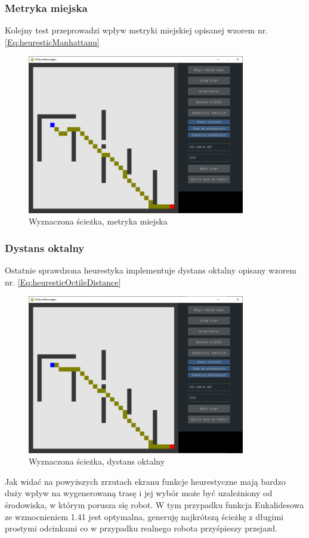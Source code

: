 \subsubsection{Metryka miejska}
Kolejny test przeprowadzi wpływ metryki miejskiej opisanej wzorem nr. \eqref{Eq:heuresticManhattanu}

\begin{figure}[H]
	\centering
	\includegraphics[width=9.5cm]{pages/testy/zdjecia/test3_taxi.png}
	\caption{Wyznaczona ścieżka, metryka miejska}
\end{figure}

\subsubsection{Dystans oktalny}
Ostatnie sprawdzona heurestyka implementuje dystans oktalny opisany wzorem nr. \eqref{Eq:heuresticOctileDistance}
\begin{figure}[H]
	\centering
	\includegraphics[width=9.5cm]{pages/testy/zdjecia/test3_H_przek.png}
	\caption{Wyznaczona ścieżka, dystans oktalny}
\end{figure}

Jak widać na powyższych zrzutach ekranu funkcje heurestyczne mają bardzo duży wpływ na wygenerowaną trasę i jej wybór może być 
uzależniony od środowiska, w którym porusza się robot. W tym przypadku funkcja Eukalidesowa ze wzmocnieniem 1.41 jest optymalna, 
generuję najkrótszą ścieżkę z długimi prostymi odcinkami co w przypadku realnego robota przyśpieszy przejazd.


